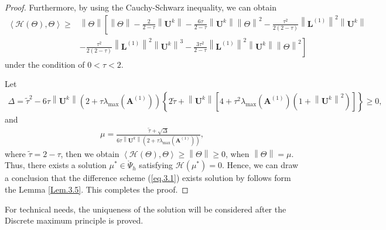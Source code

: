 \documentclass{siamart171218}
\numberwithin{theorem}{section}
\numberwithin{equation}{section}
\begin{document}
\begin{proof}
Furthermore,
by using the Cauchy-Schwarz inequality,
we can obtain
\begin{equation*}
\begin{aligned}\displaystyle
\left\langle\mathcal{H} \left(\Theta\right),\Theta\right\rangle
\geq&\left\|\Theta\right\|\left[\left\|\Theta\right\|-\frac{2}{2-\tau}
\left\|{\mathbf{U}}^{k}\right\|
-\frac{6\tau}{2-\tau}\left\|\mathbf{U}^{k}\right\|\left\|\Theta\right\|^2
-\frac{\tau^2}{2(2-\tau)}
\left\|\mathbf{L}^{(1)}\right\|^2
\left\|\mathbf{U}^{k}\right\|\right.\\
&\left.
-\frac{\tau^2}{2(2-\tau)}
\left\|\mathbf{L}^{(1)}\right\|^2\left\|\mathbf{U}^{k}\right\|^3
-\frac{3\tau^2}{2-\tau}
\left\|\mathbf{L}^{(1)}\right\|^2\left\|\mathbf{U}^{k}\right\|\left\|\Theta\right\|^2
\right]
\end{aligned}
\end{equation*}
under the condition of $0<\tau<2$.

Let
\begin{equation*}
\begin{aligned}\displaystyle
\Delta=\tilde{\tau}^2
-6\tau\left\|\mathbf{U}^{k}\right\|\left(2+\tau\lambda_{\max}\left(\mathbf{A}^{(1)}\right)\right)
\left\{2\tilde{\tau}+\left\|\mathbf{U}^{k}\right\|
\left[4+\tau^2\lambda_{\max}\left(\mathbf{A}^{(1)}\right)
\left(1+\left\|\mathbf{U}^{k}\right\|^2\right)\right]\right\}\geq0,
\end{aligned}
\end{equation*}
and
\begin{equation*}
\begin{aligned}\displaystyle
\mu=\frac{\tilde{\tau}+
\sqrt{\Delta}}{6\tau\left\|\mathbf{U}^{k}\right\|\left(2+\tau
\lambda_{\max}\left(\mathbf{A}^{(1)}\right)\right)},
\end{aligned}
\end{equation*}
where $\tilde{\tau}=2-\tau$, then we obtain
$\left\langle\mathcal{H} \left(\Theta\right),\Theta\right\rangle
\geq\left\|\Theta\right\|\geq0$, when $\left\|\Theta\right\|=\mu$.
Thus, there exists a solution $\mu^*\in \mathring{\Psi}_h$
satisfying  $\mathcal{H}\left(\mu^*\right)= 0$.
Hence, we can draw a conclusion that the difference scheme
(\ref{eq.3.1}) exists solution
by follows form the Lemma \ref{Lem.3.5}. This completes the proof.
\end{proof}

For technical needs, the uniqueness of the solution will
 be considered after the Discrete maximum principle is proved.
\end{document}
